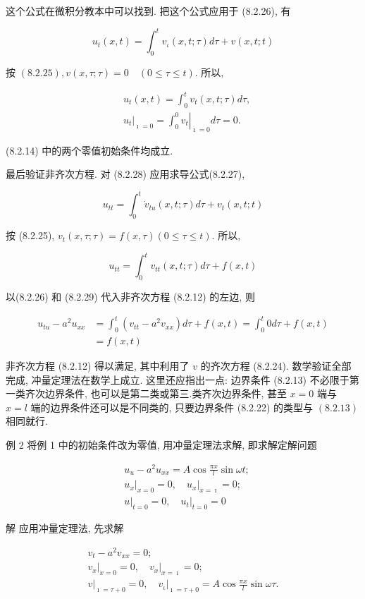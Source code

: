 这个公式在微积分教本中可以找到. 把这个公式应用于 (8.2.26), 有

$$
u_{t}(x, t)=\int_{0}^{t} v_{\iota}(x, t ; \tau) d \tau+v(x, t ; t)
$$

按 $(8.2 .25), v(x, \tau ; \tau)=0 \quad(0 \leqslant \tau \leqslant t)$. 所以,

$$
\begin{aligned}
& u_{t}(x, t)=\int_{0}^{t} v_{t}(x, t ; \tau) d \tau, \\
& \left.u_{t}\right|_{\imath=0}=\left.\int_{0}^{0} v_{t}\right|_{\imath=0} d \tau=0 .
\end{aligned}
$$

(8.2.14) 中的两个零值初始条件均成立.

最后验证非齐次方程. 对 (8.2.28) 应用求导公式(8.2.27),

$$
u_{t t}=\int_{0}^{t} \dot{v}_{t u}(x, t ; \tau) d \tau+v_{t}(x, t ; t)
$$

按 (8.2.25), $v_{t}(x, \tau ; \tau)=f(x, \tau)(0 \leqslant \tau \leqslant t)$. 所以,

$$
u_{t t}=\int_{0}^{t} v_{t t}(x, t ; \tau) d \tau+f(x, t)
$$

以(8.2.26) 和 (8.2.29) 代入非齐次方程 (8.2.12) 的左边, 则

$$
\begin{aligned}
u_{t u}-a^{2} u_{x x} & =\int_{0}^{t}\left(v_{t t}-a^{2} v_{x x}\right) d \tau+f(x, t)=\int_{0}^{t} 0 d \tau+f(x, t) \\
& =f(x, t)
\end{aligned}
$$

非齐次方程 (8.2.12) 得以满足, 其中利用了 $v$ 的齐次方程 (8.2.24).
数学验证全部完成, 冲量定理法在数学上成立. 这里还应指出一点: 边界条件 (8.2.13) 不必限于第一类齐次边界条件, 也可以是第二类或第三.类齐次边界条件, 甚至 $x=0$ 端与 $x=l$ 端的边界条件还可以是不同类的, 只要边界条件 (8.2.22) 的类型与 $(8.2 .13)$ 相同就行.

例 2 将例 1 中的初始条件改为零值, 用冲量定理法求解, 即求解定解问题

$$
\begin{aligned}
& u_{u}-a^{2} u_{x x}=A \cos \frac{\pi x}{l} \sin \omega t ; \\
& \left.u_{x}\right|_{x=0}=0,\left.\quad u_{x}\right|_{x=\imath}=0 ; \\
& \left.u\right|_{t=0}=0,\left.\quad u_{t}\right|_{t=0}=0
\end{aligned}
$$

解 应用冲量定理法, 先求解

$$
\begin{gathered}
v_{t}-a^{2} v_{x x}=0 ; \\
\left.v_{x}\right|_{x=0}=0,\left.\quad v_{x}\right|_{x=\imath}=0 ; \\
\left.v\right|_{\imath=\tau+0}=0,\left.\quad v_{\iota}\right|_{\imath=\tau+0}=A \cos \frac{\pi x}{l} \sin \omega \tau .
\end{gathered}
$$


